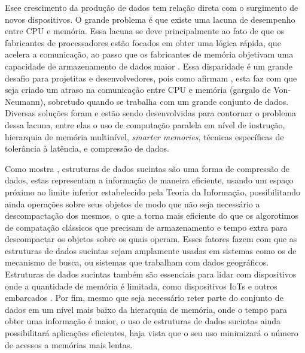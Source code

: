 Esee crescimento da produção de dados tem relação direta com o surgimento de novos dispositivos. O grande problema é que existe uma lacuna de
desempenho entre CPU e memória. Essa lacuna se deve principalmente ao fato de que os fabricantes de processadores estão focados em obter uma lógica rápida, 
que acelera a comunicação, ao passo que os fabricantes de memória objetivam uma capacidade de armazenamento de dados maior \citep{paper-processor-memory-bottleneck}.
Essa disparidade é um grande desafio para projetitas e desenvolvedores, pois como afirmam \citet{paper-processor-memory-bottleneck}, 
esta faz com que seja criado um atraso na comunicação entre CPU e memória (gargalo de Von-Neumann), sobretudo quando se trabalha com um grande conjunto
de dados. Diversas soluções foram e estão sendo desenvolvidas para contornar o problema dessa lacuna, entre elas o uso de computação paralela em nível
de instrução, hierarquia de memória multinível, \textit{smarter memories}, técnicas específicas de tolerância à latência, e compressão de dados.
\citep{paper-Processor-Memory-bottleneck-Problems-Solutions, paper-processor-memory-bottleneck}


Como mostra \cite{book-compact-data-structures}, estruturas de dados sucintas são uma forma de compressão de dados, estas representam a informação de
maneira eficiente, usando um espaço próximo ao limite inferior estabelecido pela Teoria da Informação, possibilitando ainda
operações sobre seus objetos de modo que não seja necessário a descompactação dos mesmos, o que a torna mais eficiente do que os algorotimos de compatação 
clássicos que precisam de armazenamento e tempo extra para descompactar os objetos sobre os quais operam. 
Esses fatores fazem com que as estruturas de dados sucintas sejam amplamente usadas em sistemas como os de mecanismo de busca, 
ou sistemas que trabalham com dados geográficos. Estruturas de dados sucintas também são essenciais para lidar  com dispositivos onde a quantidade de memória é limitada, como  dispositivos IoTs e outros embarcados \citep{book-compact-data-structures}.
Por fim, mesmo que seja necessário reter parte do conjunto de dados em um nível mais baixo da hierarquia de memória, onde o tempo para obter uma informação 
é maior, o uso de estruturas de dados sucintas ainda possibilitará aplicações eficientes, haja vista que o seu uso minimizará o número de acessos a 
memórias mais lentas.

